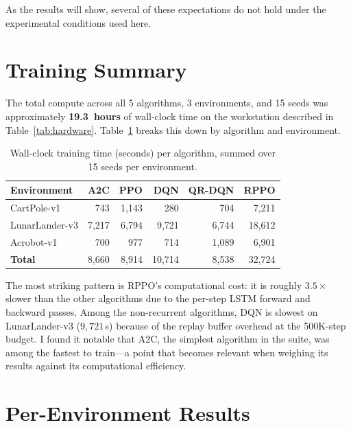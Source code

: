 As the results will show, several of these expectations do not hold under the experimental conditions used here.

\section{Training Summary}
\label{sec:training-summary}

The total compute across all 5 algorithms, 3 environments, and 15 seeds
was approximately \textbf{19.3~hours} of wall-clock time on the
workstation described in Table~\ref{tab:hardware}. Table~\ref{tab:training-time}
breaks this down by algorithm and environment.

\begin{table}[htbp!]
\centering
\caption[EXP1: Wall-clock training time]{Wall-clock training time (seconds) per algorithm, summed over 15 seeds per environment.}
\label{tab:training-time}
\begin{tabular}{lrrrrr}
\toprule
\textbf{Environment} & \textbf{A2C} & \textbf{PPO} & \textbf{DQN}
                      & \textbf{QR-DQN} & \textbf{RPPO} \\
\midrule
CartPole-v1     &    743 &  1{,}143 &    280 &    704 &  7{,}211 \\
LunarLander-v3  &  7{,}217 &  6{,}794 &  9{,}721 &  6{,}744 & 18{,}612 \\
Acrobot-v1      &    700 &    977 &    714 &  1{,}089 &  6{,}901 \\
\midrule
\textbf{Total}  &  8{,}660 &  8{,}914 & 10{,}714 &  8{,}538 & 32{,}724 \\
\bottomrule
\end{tabular}
\end{table}

The most striking pattern is RPPO's computational cost: it is roughly
$3.5\times$ slower than the other algorithms due to the per-step LSTM
forward and backward passes. Among the non-recurrent algorithms, DQN is
slowest on LunarLander-v3 ($9{,}721$\,s) because of the replay buffer
overhead at the 500K-step budget. I found it notable that A2C, the
simplest algorithm in the suite, was among the fastest to train---a
point that becomes relevant when weighing its results against its
computational efficiency.

\section{Per-Environment Results}
\label{sec:per-env-results}

